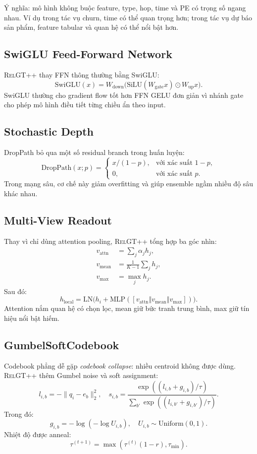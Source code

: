 \documentclass[12pt,a4paper]{article}
\newcommand{\RelGTpp}{\textsc{RelGT++}}
\newcommand{\concat}{\mathbin{\Vert}}
\begin{document}
Ý nghĩa: mô hình không buộc feature, type, hop, time và PE có trọng số ngang
nhau. Ví dụ trong tác vụ churn, time có thể quan trọng hơn; trong tác vụ dự
báo sản phẩm, feature tabular và quan hệ có thể nổi bật hơn.

\subsection{SwiGLU Feed-Forward Network}

\RelGTpp{} thay FFN thông thường bằng SwiGLU:
\[
  \text{SwiGLU}(x)=
  W_\text{down}\bigl(\text{SiLU}(W_\text{gate}x)\odot W_\text{up}x\bigr).
\]
SwiGLU thường cho gradient flow tốt hơn FFN GELU đơn giản vì nhánh gate cho
phép mô hình điều tiết từng chiều ẩn theo input.

\subsection{Stochastic Depth}

DropPath bỏ qua một số residual branch trong huấn luyện:
\[
  \text{DropPath}(x;p)=
  \begin{cases}
    x/(1-p), & \text{với xác suất }1-p,\\
    0, & \text{với xác suất }p.
  \end{cases}
\]
Trong mạng sâu, cơ chế này giảm overfitting và giúp ensemble ngầm nhiều độ
sâu khác nhau.

\subsection{Multi-View Readout}

Thay vì chỉ dùng attention pooling, \RelGTpp{} tổng hợp ba góc nhìn:
\begin{align}
  v_\text{attn} &= \sum_j\alpha_jh_j,\\
  v_\text{mean} &= \frac{1}{K-1}\sum_jh_j,\\
  v_\text{max} &= \max_jh_j.
\end{align}
Sau đó:
\[
  h_\text{local}=\text{LN}\bigl(h_i+
  \text{MLP}([v_\text{attn}\concat v_\text{mean}\concat v_\text{max}])\bigr).
\]
Attention nắm quan hệ có chọn lọc, mean giữ bức tranh trung bình, max giữ
tín hiệu nổi bật hiếm.

\subsection{GumbelSoftCodebook}

Codebook phẳng dễ gặp \emph{codebook collapse}: nhiều centroid không được dùng.
\RelGTpp{} thêm Gumbel noise và soft assignment:
\[
  l_{i,b}=-\|q_i-e_b\|_2^2,\quad
  s_{i,b}=\frac{\exp((l_{i,b}+g_{i,b})/\tau)}
  {\sum_{b'}\exp((l_{i,b'}+g_{i,b'})/\tau)}.
\]
Trong đó:
\[
  g_{i,b}=-\log(-\log U_{i,b}),\quad U_{i,b}\sim\text{Uniform}(0,1).
\]
Nhiệt độ được anneal:
\[
  \tau^{(t+1)}=\max(\tau^{(t)}(1-r),\tau_\text{min}).
\]
\end{document}
